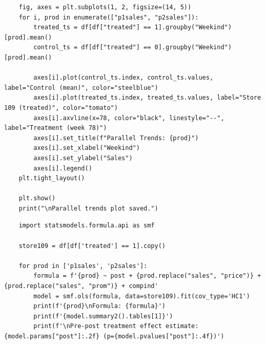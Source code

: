 \documentclass[10pt]{article}
\begin{document}
\begin{lstlisting}
    fig, axes = plt.subplots(1, 2, figsize=(14, 5))
    for i, prod in enumerate(["p1sales", "p2sales"]):
        treated_ts = df[df["treated"] == 1].groupby("Weekind")[prod].mean()
        control_ts = df[df["treated"] == 0].groupby("Weekind")[prod].mean()
        
        axes[i].plot(control_ts.index, control_ts.values, label="Control (mean)", color="steelblue")
        axes[i].plot(treated_ts.index, treated_ts.values, label="Store 109 (treated)", color="tomato")
        axes[i].axvline(x=78, color="black", linestyle="--", label="Treatment (week 78)")
        axes[i].set_title(f"Parallel Trends: {prod}")
        axes[i].set_xlabel("Weekind")
        axes[i].set_ylabel("Sales")
        axes[i].legend()
    plt.tight_layout()

    plt.show()
    print("\nParallel trends plot saved.")
\end{lstlisting}
\begin{lstlisting}
    import statsmodels.formula.api as smf

    store109 = df[df['treated'] == 1].copy()

    for prod in ['p1sales', 'p2sales']: 
        formula = f'{prod} ~ post + {prod.replace("sales", "price")} + {prod.replace("sales", "prom")} + compind'
        model = smf.ols(formula, data=store109).fit(cov_type='HC1')
        print(f'{prod}\nFormula: {formula}')
        print(f'{model.summary2().tables[1]}')
        print(f'\nPre-post treatment effect estimate: {model.params["post"]:.2f} (p={model.pvalues["post"]:.4f})')
\end{lstlisting}
\end{document}
